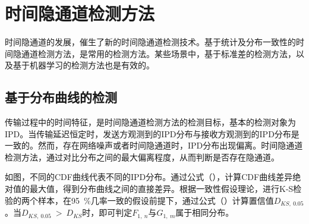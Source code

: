 \section{时间隐通道检测方法}
\label{chap:backinfo:detect}

时间隐通道的发展，催生了新的时间隐通道检测技术。基于统计及分布一致性的时间隐通道检测方法，是常用的检测方法。某些场景中，基于标准差的检测方法，以及基于机器学习的检测方法也是有效的。

\subsection{基于分布曲线的检测}
\label{chap:backinfo:detect:statistical}

传输过程中的时间特征，是时间隐通道检测方法的检测目标，基本的检测对象为IPD。当传输延迟恒定时，发送方观测到的IPD分布与接收方观测到的IPD分布是一致的。然而，存在网络噪声或者时间隐通道时，IPD分布出现偏离。时间隐通道检测方法，通过对比分布之间的最大偏离程度，从而判断是否存在隐通道。

如图，不同的CDF曲线代表不同的IPD分布。通过公式（），计算CDF曲线差异绝对值的最大值，得到分布曲线之间的直接差异。根据一致性假设理论，进行K-S检验的两个样本，在{95\ \%}几率一致的假设前提下，通过公式（）计算置信值$D_{KS,\ 0.05}$。当$D_{KS,\ 0.05}\ >\ D_{KS}$时，即可判定$F_{1,\ n}$与$G_{1,\ m}$属于相同分布。

